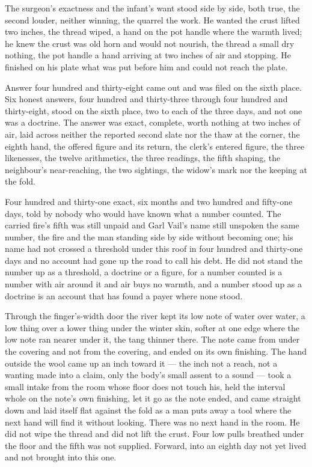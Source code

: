 The surgeon's exactness and the infant's want stood side by side, both true, the second louder, neither winning, the quarrel the work. He wanted the crust lifted two inches, the thread wiped, a hand on the pot handle where the warmth lived; he knew the crust was old horn and would not nourish, the thread a small dry nothing, the pot handle a hand arriving at two inches of air and stopping. He finished on his plate what was put before him and could not reach the plate.

Answer four hundred and thirty-eight came out and was filed on the sixth place. Six honest answers, four hundred and thirty-three through four hundred and thirty-eight, stood on the sixth place, two to each of the three days, and not one was a doctrine. The answer was exact, complete, worth nothing at two inches of air, laid across neither the reported second slate nor the thaw at the corner, the eighth hand, the offered figure and its return, the clerk's entered figure, the three likenesses, the twelve arithmetics, the three readings, the fifth shaping, the neighbour's near-reaching, the two sightings, the widow's mark nor the keeping at the fold.

Four hundred and thirty-one exact, six months and two hundred and fifty-one days, told by nobody who would have known what a number counted. The carried fire's fifth was still unpaid and Garl Vail's name still unspoken the same number, the fire and the man standing side by side without becoming one; his name had not crossed a threshold under this roof in four hundred and thirty-one days and no account had gone up the road to call his debt. He did not stand the number up as a threshold, a doctrine or a figure, for a number counted is a number with air around it and air buys no warmth, and a number stood up as a doctrine is an account that has found a payer where none stood.

Through the finger's-width door the river kept its low note of water over water, a low thing over a lower thing under the winter skin, softer at one edge where the low note ran nearer under it, the tang thinner there. The note came from under the covering and not from the covering, and ended on its own finishing. The hand outside the wool came up an inch toward it --- the inch not a reach, not a wanting made into a claim, only the body's small assent to a sound --- took a small intake from the room whose floor does not touch his, held the interval whole on the note's own finishing, let it go as the note ended, and came straight down and laid itself flat against the fold as a man puts away a tool where the next hand will find it without looking. There was no next hand in the room. He did not wipe the thread and did not lift the crust. Four low pulls breathed under the floor and the fifth was not supplied. Forward, into an eighth day not yet lived and not brought into this one.
